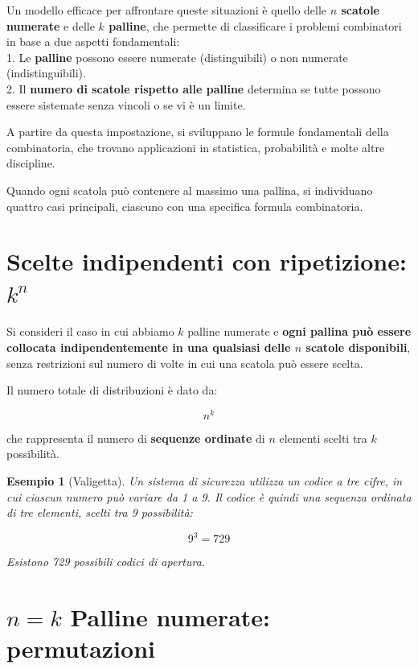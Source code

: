 \documentclass[
  11pt,
]{book}
\theoremstyle{mytheoremstyle}
\theoremstyle{mydefstyle}
\newtheorem{example}{{Esempio}}[section]
\begin{document}
Un modello efficace per affrontare queste situazioni è quello delle \textbf{\(n\) scatole numerate} e delle \textbf{\(k\) palline}, che permette di classificare i problemi combinatori in base a due aspetti fondamentali:\\
1. Le \textbf{palline} possono essere numerate (distinguibili) o non numerate (indistinguibili).\\
2. Il \textbf{numero di scatole rispetto alle palline} determina se tutte possono essere sistemate senza vincoli o se vi è un limite.

A partire da questa impostazione, si sviluppano le formule fondamentali della combinatoria, che trovano applicazioni in statistica, probabilità e molte altre discipline.

Quando ogni scatola può contenere al massimo una pallina, si individuano quattro casi principali, ciascuno con una specifica formula combinatoria.

\section{\texorpdfstring{Scelte indipendenti con ripetizione: \(k^n\)}{Scelte indipendenti con ripetizione: k\^{}n}}\label{scelte-indipendenti-con-ripetizione-kn}

Si consideri il caso in cui abbiamo \(k\) palline numerate e \textbf{ogni pallina può essere collocata indipendentemente in una qualsiasi delle \(n\) scatole disponibili}, senza restrizioni sul numero di volte in cui una scatola può essere scelta.

Il numero totale di distribuzioni è dato da:

\[
n^k
\]

che rappresenta il numero di \textbf{sequenze ordinate} di \(n\) elementi scelti tra \(k\) possibilità.

\begin{example}[Valigetta]
Un sistema di sicurezza utilizza un codice a tre cifre, in cui ciascun numero può variare da 1 a 9. Il codice è quindi una sequenza ordinata di tre elementi, scelti tra 9 possibilità:

\[
9^3 = 729
\]

Esistono 729 possibili codici di apertura.
\end{example}

\section{\texorpdfstring{\(n = k\) Palline numerate: permutazioni}{n = k Palline numerate: permutazioni}}\label{n-k-palline-numerate-permutazioni}
\end{document}
